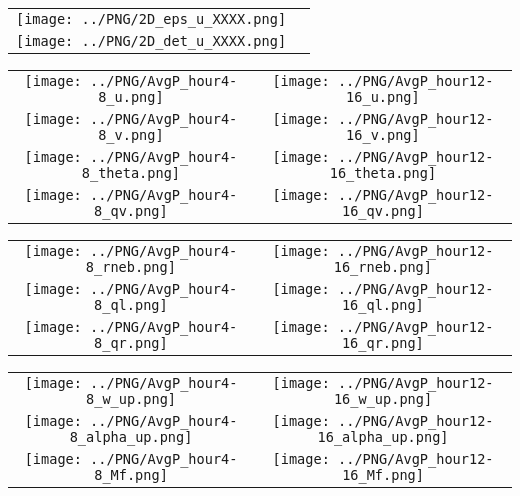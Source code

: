 \documentclass{article}
\begin{document}

\begin{table}
  \begin{tabular}{cc}
     \texttt{[image: ../PNG/2D\_eps\_u\_XXXX.png]} & \\%
     \texttt{[image: ../PNG/2D\_det\_u\_XXXX.png]} & %
  \end{tabular}
\end{table}

\newpage

\begin{table}
  \begin{tabular}{cc}
     \texttt{[image: ../PNG/AvgP\_hour4-8\_u.png]}     & \texttt{[image: ../PNG/AvgP\_hour12-16\_u.png]}     \\
     \texttt{[image: ../PNG/AvgP\_hour4-8\_v.png]}     & \texttt{[image: ../PNG/AvgP\_hour12-16\_v.png]}     \\
     \texttt{[image: ../PNG/AvgP\_hour4-8\_theta.png]} & \texttt{[image: ../PNG/AvgP\_hour12-16\_theta.png]} \\
     \texttt{[image: ../PNG/AvgP\_hour4-8\_qv.png]}    & \texttt{[image: ../PNG/AvgP\_hour12-16\_qv.png]}
  \end{tabular}
\end{table}

\newpage

\begin{table}
  \begin{tabular}{cc}
     \texttt{[image: ../PNG/AvgP\_hour4-8\_rneb.png]} & \texttt{[image: ../PNG/AvgP\_hour12-16\_rneb.png]} \\
     \texttt{[image: ../PNG/AvgP\_hour4-8\_ql.png]}   & \texttt{[image: ../PNG/AvgP\_hour12-16\_ql.png]}  \\
     \texttt{[image: ../PNG/AvgP\_hour4-8\_qr.png]}   & \texttt{[image: ../PNG/AvgP\_hour12-16\_qr.png]}
  \end{tabular}
\end{table}

\newpage

\begin{table}
  \begin{tabular}{cc}
     \texttt{[image: ../PNG/AvgP\_hour4-8\_w\_up.png]}     & \texttt{[image: ../PNG/AvgP\_hour12-16\_w\_up.png]}     \\
     \texttt{[image: ../PNG/AvgP\_hour4-8\_alpha\_up.png]} & \texttt{[image: ../PNG/AvgP\_hour12-16\_alpha\_up.png]} \\
     \texttt{[image: ../PNG/AvgP\_hour4-8\_Mf.png]}       & \texttt{[image: ../PNG/AvgP\_hour12-16\_Mf.png]}
  \end{tabular}
\end{table}
\end{document}
